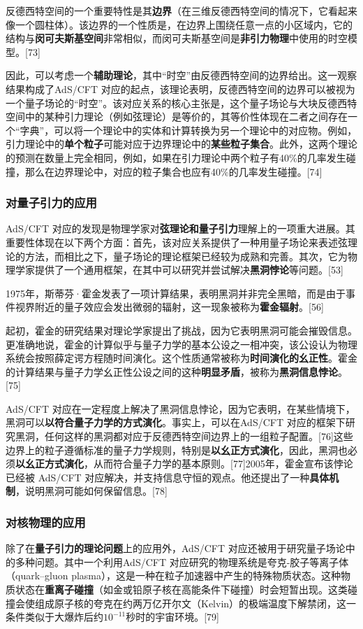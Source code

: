 反德西特空间的一个重要特性是其\textbf{边界}（在三维反德西特空间的情况下，它看起来像一个圆柱体）。该边界的一个性质是，在边界上围绕任意一点的小区域内，它的结构与\textbf{闵可夫斯基空间}非常相似，而闵可夫斯基空间是\textbf{非引力物理}中使用的时空模型。[73]  

因此，可以考虑一个\textbf{辅助理论}，其中“时空”由反德西特空间的边界给出。这一观察结果构成了AdS/CFT 对应的起点，该理论表明，反德西特空间的边界可以被视为一个量子场论的“时空”。该对应关系的核心主张是，这个量子场论与大块反德西特空间中的某种引力理论（例如弦理论）是等价的，其等价性体现在二者之间存在一个“字典”，可以将一个理论中的实体和计算转换为另一个理论中的对应物。例如，引力理论中的\textbf{单个粒子}可能对应于边界理论中的\textbf{某些粒子集合}。此外，这两个理论的预测在数量上完全相同，例如，如果在引力理论中两个粒子有40\%的几率发生碰撞，那么在边界理论中，对应的粒子集合也应有40\%的几率发生碰撞。[74]
\subsubsection{对量子引力的应用}
AdS/CFT 对应的发现是物理学家对\textbf{弦理论和量子引力}理解上的一项重大进展。其重要性体现在以下两个方面：首先，该对应关系提供了一种用量子场论来表述弦理论的方法，而相比之下，量子场论的理论框架已经较为成熟和完善。其次，它为物理学家提供了一个通用框架，在其中可以研究并尝试解决\textbf{黑洞悖论}等问题。[53]

1975年，斯蒂芬·霍金发表了一项计算结果，表明黑洞并非完全黑暗，而是由于事件视界附近的量子效应会发出微弱的辐射，这一现象被称为\textbf{霍金辐射}。[56]  

起初，霍金的研究结果对理论学家提出了挑战，因为它表明黑洞可能会摧毁信息。更准确地说，霍金的计算似乎与量子力学的基本公设之一相冲突，该公设认为物理系统会按照薛定谔方程随时间演化。这个性质通常被称为\textbf{时间演化的幺正性}。霍金的计算结果与量子力学幺正性公设之间的这种\textbf{明显矛盾}，被称为\textbf{黑洞信息悖论}。[75]

AdS/CFT 对应在一定程度上解决了黑洞信息悖论，因为它表明，在某些情境下，黑洞可以\textbf{以符合量子力学的方式演化}。事实上，可以在AdS/CFT 对应的框架下研究黑洞，任何这样的黑洞都对应于反德西特空间边界上的一组粒子配置。[76]这些边界上的粒子遵循标准的量子力学规则，特别是\textbf{以幺正方式演化}，因此，黑洞也必须\textbf{以幺正方式演化}，从而符合量子力学的基本原则。[77]2005年，霍金宣布该悖论已经被 AdS/CFT 对应解决，并支持信息守恒的观点。他还提出了一种\textbf{具体机制}，说明黑洞可能如何保留信息。[78]
\subsubsection{对核物理的应用}
除了在\textbf{量子引力的理论问题}上的应用外，AdS/CFT 对应还被用于研究量子场论中的多种问题。其中一个利用AdS/CFT 对应研究的物理系统是夸克-胶子等离子体（quark–gluon plasma），这是一种在粒子加速器中产生的特殊物质状态。这种物质状态在\textbf{重离子碰撞}（如金或铅原子核在高能条件下碰撞）时会短暂出现。这类碰撞会使组成原子核的夸克在约两万亿开尔文（Kelvin）的极端温度下解禁闭，这一条件类似于大爆炸后约\(10^{-11}\)秒时的宇宙环境。[79]

